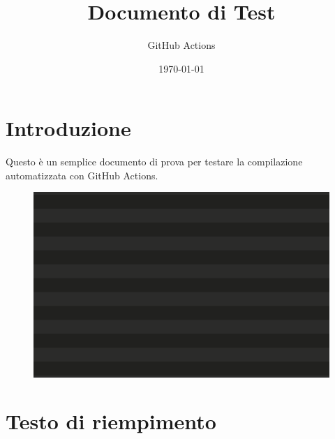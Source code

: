 \documentclass{article}
\begin{document}
\title{Documento di Test}
\author{GitHub Actions}
\date{\today}

\maketitle

\section{Introduzione}
Questo è un semplice documento di prova per testare la compilazione automatizzata con GitHub Actions.

\begin{figure}
	\centering
	\includegraphics[width=0.7\linewidth]{Immagini/test}
	\caption{}
	\label{fig:test}
\end{figure}


\section{Testo di riempimento}
\lipsum[1-3]
\end{document}
